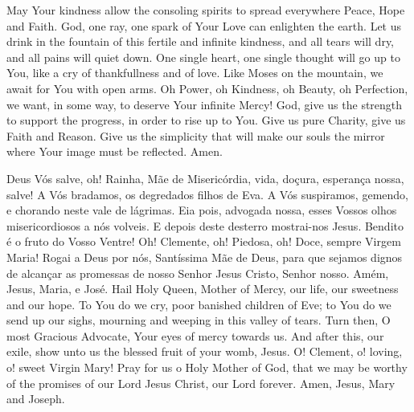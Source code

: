 {\begin{songs}{}
        \ind May Your kindness allow the consoling spirits to
        spread everywhere Peace, Hope and Faith.
        \ind God, one ray, one spark of Your Love can enlighten
        the earth.
        \ind Let us drink in the fountain of this fertile and
        infinite kindness, and all tears will dry, and all pains
        will quiet down.
        \ind One single heart, one single thought will go up to
        You, like a cry of thankfullness and of love.
        \ind Like Moses on the mountain, we await for You with
        open arms.
        \ind Oh Power, oh Kindness, oh Beauty, oh Perfection,
        we want, in some way, to deserve Your infinite Mercy!
        \ind God, give us the strength to support the progress,
        in order to rise up to You.
        \ind Give us pure Charity, give us Faith and Reason.
        \ind Give us the simplicity that will make our souls the
        mirror where Your image must be reflected.
        \parspace
        Amen.
      \endverse
    \endsong


      \beginverse
        Deus Vós salve, oh! Rainha, Mãe de Misericórdia,
        vida, doçura, esperança nossa, salve!
        \ind A Vós bradamos, os degredados filhos de Eva.
        \ind A Vós suspiramos, gemendo, e chorando neste
        vale de lágrimas.
        \ind Eia pois, advogada nossa, esses Vossos olhos
        misericordiosos a nós volveis.
        \ind E depois deste desterro mostrai-nos Jesus.
        \ind Bendito é o fruto do Vosso Ventre!
        \ind Oh! Clemente, oh! Piedosa, oh! Doce, sempre
        Virgem Maria!
        \ind Rogai a Deus por nós, Santíssima Mãe de Deus,
        para que sejamos dignos de alcançar as promessas
        de nosso Senhor Jesus Cristo, Senhor nosso.
        \parspace
        Amém, Jesus, Maria, e José.
      \endverse
      \beginverse\color{englishcolor}
        Hail Holy Queen, Mother of Mercy, our life, our
        sweetness and our hope.
        \ind To You do we cry, poor banished children of Eve;
        \ind to You do we send up our sighs, mourning and
        weeping in this valley of tears.
        \ind Turn then, O most Gracious Advocate, Your eyes
        of mercy towards us.
        \ind And after this, our exile, show unto us the
        blessed fruit of your womb, Jesus.
        \ind O! Clement, o! loving, o! sweet Virgin Mary!
        \ind Pray for us o Holy Mother of God, that we may
        be worthy of the promises of our Lord Jesus Christ,
        our Lord forever.
        \parspace
        Amen, Jesus, Mary and Joseph.
      \endverse
    \endsong



\end{songs}}
